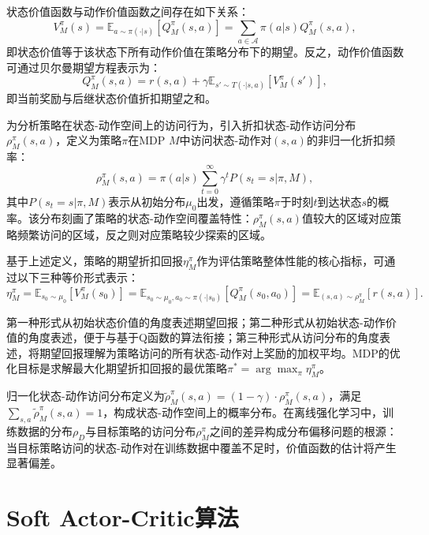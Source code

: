 状态价值函数与动作价值函数之间存在如下关系：
\begin{equation}\label{Eq:Chap2_v_q_relation}
  V_M^\pi(s) = \mathbb{E}_{a \sim \pi(\cdot|s)}[Q_M^\pi(s,a)] = \sum_{a \in \mathcal{A}} \pi(a|s) Q_M^\pi(s,a),
\end{equation}
即状态价值等于该状态下所有动作价值在策略分布下的期望。反之，动作价值函数可通过贝尔曼期望方程表示为：
\begin{equation}\label{Eq:Chap2_bellman}
  Q_M^\pi(s,a) = r(s,a) + \gamma \mathbb{E}_{s' \sim T(\cdot|s,a)}[V_M^\pi(s')],
\end{equation}
即当前奖励与后继状态价值折扣期望之和。

为分析策略在状态-动作空间上的访问行为，引入折扣状态-动作访问分布$\rho_M^\pi(s,a)$，定义为策略$\pi$在MDP $M$中访问状态-动作对$(s,a)$的非归一化折扣频率：
\begin{equation}\label{Eq:Chap2_visit_distribution}
  \rho_M^\pi(s,a) = \pi(a|s) \sum_{t=0}^{\infty} \gamma^t P(s_t = s | \pi, M),
\end{equation}
其中$P(s_t=s | \pi, M)$表示从初始分布$\mu_0$出发，遵循策略$\pi$于时刻$t$到达状态$s$的概率。该分布刻画了策略的状态-动作空间覆盖特性：$\rho_M^\pi(s,a)$值较大的区域对应策略频繁访问的区域，反之则对应策略较少探索的区域。

基于上述定义，策略的期望折扣回报$\eta_M^\pi$作为评估策略整体性能的核心指标，可通过以下三种等价形式表示：
\begin{equation}\label{Eq:Chap2_expected_return}
  \eta_M^\pi = \mathbb{E}_{s_0 \sim \mu_0}[V_M^\pi(s_0)] = \mathbb{E}_{s_0 \sim \mu_0, a_0 \sim \pi(\cdot|s_0)}[Q_M^\pi(s_0, a_0)] = \mathbb{E}_{(s,a) \sim \rho_M^\pi} \left[ r(s, a) \right].
\end{equation}

第一种形式从初始状态价值的角度表述期望回报；第二种形式从初始状态-动作价值的角度表述，便于与基于Q函数的算法衔接；第三种形式从访问分布的角度表述，将期望回报理解为策略访问的所有状态-动作对上奖励的加权平均。MDP的优化目标是求解最大化期望折扣回报的最优策略$\pi^* = \arg\max_\pi \eta_M^\pi$。

归一化状态-动作访问分布定义为$\tilde{\rho}_M^\pi(s,a) = (1 - \gamma) \cdot \rho_M^\pi(s,a)$，满足$\sum_{s,a}\tilde{\rho}_M^\pi(s,a) = 1$，构成状态-动作空间上的概率分布。在离线强化学习中，训练数据的分布$\rho_D$与目标策略的访问分布$\rho_M^\pi$之间的差异构成分布偏移问题的根源：当目标策略访问的状态-动作对在训练数据中覆盖不足时，价值函数的估计将产生显著偏差。


\section{Soft Actor-Critic算法}\label{Sec2.2}

